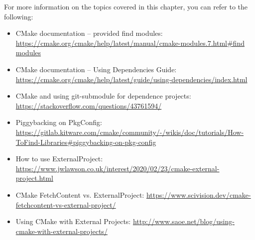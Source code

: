 For more information on the topics covered in this chapter, you can refer to the following:

\begin{itemize}
\item
CMake documentation – provided find modules: \url{https://cmake.org/cmake/help/latest/manual/cmake-modules.7.html#find modules}

\item
CMake documentation – Using Dependencies Guide: \url{https://cmake.org/cmake/help/latest/guide/using-dependencies/index.html}

\item
CMake and using git-submodule for dependence projects: \url{https://stackoverflow.com/questions/43761594/}

\item
Piggybacking on PkgConfig: \url{https://gitlab.kitware.com/cmake/community/-/wikis/doc/tutorials/How-ToFind-Libraries#piggybacking-on-pkg-config}

\item
How to use ExternalProject: \url{https://www.jwlawson.co.uk/interest/2020/02/23/cmake-external-project.html}

\item
CMake FetchContent vs. ExternalProject: \url{https://www.scivision.dev/cmake-fetchcontent-vs-external-project/}

\item
Using CMake with External Projects: \url{http://www.saoe.net/blog/using-cmake-with-external-projects/}
\end{itemize}

















